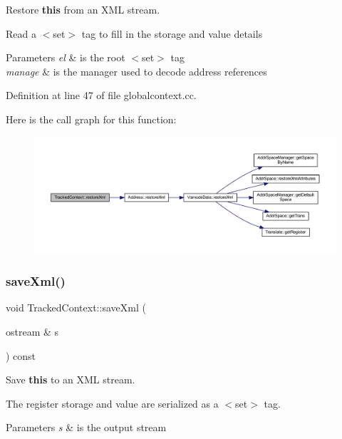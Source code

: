Restore {\bfseries{this}} from an X\+ML stream. 

Read a $<$set$>$ tag to fill in the storage and value details 
\begin{DoxyParams}{Parameters}
{\em el} & is the root $<$set$>$ tag \\
\hline
{\em manage} & is the manager used to decode address references \\
\hline
\end{DoxyParams}


Definition at line 47 of file globalcontext.\+cc.

Here is the call graph for this function\+:
\nopagebreak
\begin{figure}[H]
\begin{center}
\leavevmode
\includegraphics[width=350pt]{struct_tracked_context_acd6122fcdd019c3a1d0be1983400424e_cgraph}
\end{center}
\end{figure}
\mbox{\label{struct_tracked_context_a8a8218db31e360cdb0f60ccada0dc709}} 
\subsubsection{\texorpdfstring{saveXml()}{saveXml()}}
{\footnotesize\ttfamily void Tracked\+Context\+::save\+Xml (\begin{DoxyParamCaption}\item[{ostream \&}]{s }\end{DoxyParamCaption}) const}



Save {\bfseries{this}} to an X\+ML stream. 

The register storage and value are serialized as a $<$set$>$ tag. 
\begin{DoxyParams}{Parameters}
{\em s} & is the output stream \\
\hline
\end{DoxyParams}



